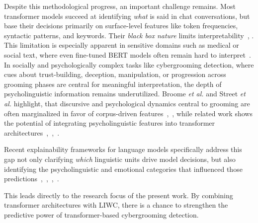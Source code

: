Despite this methodological progress, an important challenge remains. Most transformer models succeed at identifying \emph{what} is said in chat conversations, but base their decisions primarily on surface-level features like token frequencies, syntactic patterns, and keywords. Their \textit{black box nature} limits interpretability~\cite{mersha2025explainabilityneuralnetworksnatural}, \cite{lokesh2025xai}. This limitation is especially apparent in sensitive domains such as medical or social text, where even fine-tuned BERT models often remain hard to interpret~\cite{talebi2024exploring}. In socially and psychologically complex tasks like cybergrooming detection, where cues about trust-building, deception, manipulation, or progression across grooming phases are central for meaningful interpretation, the depth of psycholinguistic information remains underutilized. Broome \textit{et al.} and Street \textit{et al.} highlight, that discursive and psychological dynamics central to grooming are often marginalized in favor of corpus-driven features~\cite{broome2020psycholinguistic},~\cite{street2024grooming}, while related work shows the potential of integrating psycholinguistic features into transformer architectures~\cite{maharjan2025llmliwc},~\cite{zwanwar2022emotion},~\cite{kerz2022transformers}.

Recent explainability frameworks for language models specifically address this gap not only clarifying \emph{which} linguistic units drive model decisions, but also identifying the psycholinguistic and emotional categories that influenced those predictions~\cite{maharjan2025llmliwc},~\cite{zwanwar2022emotion},~\cite{lokesh2025xai},~\cite{ribeiro2024methodologyexplainablelargelanguage}.

This leads directly to the research focus of the present work. By combining transformer architectures with LIWC, there is a chance to strengthen the predictive power of transformer-based cybergrooming detection.


